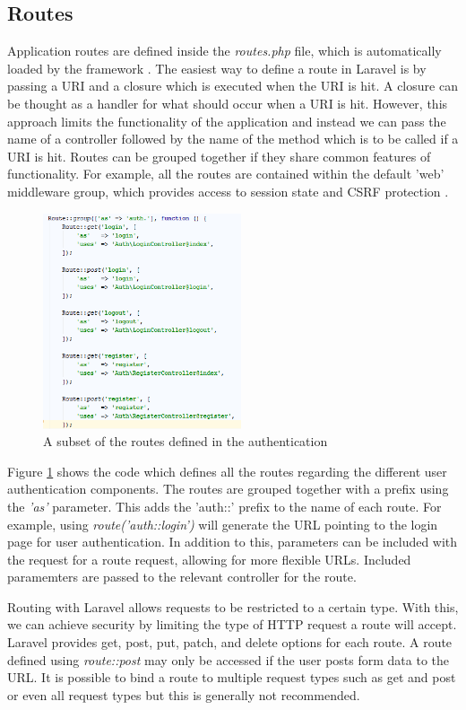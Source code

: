 \subsection{Routes}
Application routes are defined inside the \textit{routes.php} file, which is automatically loaded by the framework \cite{Laravel:Routing}. The easiest way to define a route in Laravel is by passing a URI and a closure which is executed when the URI is hit. A closure can be thought as a handler for what should occur when a URI is hit. However, this approach limits the functionality of the application and instead we can pass the name of a controller followed by the name of the method which is to be called if a URI is hit. Routes can be grouped together if they share common features of functionality. For example, all the routes are contained within the default 'web' middleware group, which provides access to session state and CSRF protection \cite{Laravel:Routing}.

\begin{figure}[H]
	\centering
	\includegraphics[height=2.5in]{Images/Implementation/LaravelRouting}
	\caption{A subset of the routes defined in the authentication} \label{fig:Routes}
\end{figure}

Figure \ref{fig:Routes} shows the code which defines all the routes regarding the different user authentication components. The routes are grouped together with a prefix using the \emph{'as'} parameter. This adds the 'auth::' prefix to the name of each route. For example, using \emph{route('auth::login')} will generate the URL pointing to the login page for user authentication. In addition to this, parameters can be included with the request for a route request, allowing for more flexible URLs. Included paramemters are passed to the relevant controller for the route. 

Routing with Laravel allows requests to be restricted to a certain type. With this, we can achieve security by limiting the type of HTTP request a route will accept. Laravel provides get, post, put, patch, and delete options for each route. A route defined using \emph{route::post} may only be accessed if the user posts form data to the URL. It is possible to bind a route to multiple request types such as get and post or even all request types but this is generally not recommended.

